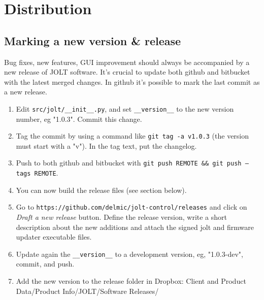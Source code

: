 \documentclass[]{article}
\begin{document}
\section{Distribution}

\subsection{Marking a new version \& release}

Bug fixes, new features, GUI improvement should always be accompanied by a new release of JOLT software. It's crucial to update both github and bitbucket with the latest merged changes.
In github it's possible to mark the last commit as a new release.
\begin{enumerate}
    \item Edit \texttt{src/jolt/\_\_init\_\_.py}, and set \texttt{\_\_version\_\_} to the new version number, eg "1.0.3".
    Commit this change.
    \item Tag the commit by using a command like \texttt{git tag -a v1.0.3} (the version must start with a "v").
    In the tag text, put the changelog.
    \item Push to both github and bitbucket with \texttt{git push REMOTE \&\& git push --tags REMOTE}.
    \item You can now build the release files (see section below).
    \item Go to \texttt{https://github.com/delmic/jolt-control/releases} and click on \emph{Draft a new release} button.
    Define the release version, write a short description about the new additions and attach the signed jolt and firmware updater executable files.
    \item Update again the \texttt{\_\_version\_\_} to a development version, eg, "1.0.3-dev", commit, and push.
    \item Add the new version to the release folder in Dropbox: Client and Product Data/Product Info/JOLT/Software Releases/
\end{enumerate}
\end{document}
